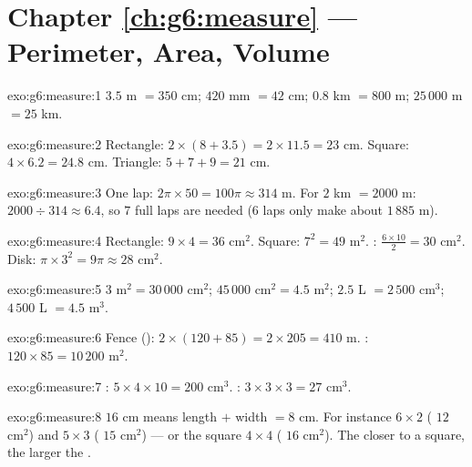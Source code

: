 \section*{Chapter \ref{ch:g6:measure} --- Perimeter, Area, Volume}

\begin{solution}{exo:g6:measure:1}
$3.5$ m $= 350$ cm; \quad $420$ mm $= 42$ cm; \quad
$0.8$ km $= 800$ m; \quad $25\,000$ m $= 25$ km.
\end{solution}

\begin{solution}{exo:g6:measure:2}
Rectangle: $2 \times (8 + 3.5) = 2 \times 11.5 = 23$ cm.
Square: $4 \times 6.2 = 24.8$ cm.
Triangle: $5 + 7 + 9 = 21$ cm.
\end{solution}

\begin{solution}{exo:g6:measure:3}
One lap: $2\pi \times 50 = 100\pi \approx 314$ m. For $2$ km
$= 2000$ m: $2000 \div 314 \approx 6.4$, so $7$ full laps are needed
($6$ laps only make about $1\,885$ m).
\end{solution}

\begin{solution}{exo:g6:measure:4}
Rectangle: $9 \times 4 = 36$ cm$^2$. Square: $7^2 = 49$ m$^2$.
: $\frac{6 \times 10}{2} = 30$ cm$^2$.
Disk: $\pi \times 3^2 = 9\pi \approx 28$ cm$^2$.
\end{solution}

\begin{solution}{exo:g6:measure:5}
$3$ m$^2 = 30\,000$ cm$^2$; \quad
$45\,000$ cm$^2 = 4.5$ m$^2$; \quad
$2.5$ L $= 2\,500$ cm$^3$; \quad
$4\,500$ L $= 4.5$ m$^3$.
\end{solution}

\begin{solution}{exo:g6:measure:6}
Fence (): $2 \times (120 + 85) = 2 \times 205 = 410$ m.
: $120 \times 85 = 10\,200$ m$^2$.
\end{solution}

\begin{solution}{exo:g6:measure:7}
: $5 \times 4 \times 10 = 200$ cm$^3$. :
$3 \times 3 \times 3 = 27$ cm$^3$.
\end{solution}

\begin{solution}{exo:g6:measure:8}
 $16$ cm means length $+$ width $= 8$ cm. For instance
$6 \times 2$ ( $12$ cm$^2$) and $5 \times 3$ ( $15$ cm$^2$)
--- or the square $4 \times 4$ ( $16$ cm$^2$). The closer to a
square, the larger the .
\end{solution}

